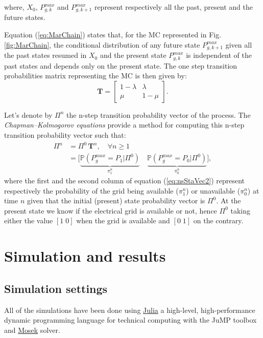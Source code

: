 \documentclass[conference]{IEEEtran}
\begin{document}
where, $X_0$, $P^{max}_{g,k}$ and $P^{max}_{g,k+1}$ represent respectively all the past,  present and the future states. 

Equation (\ref{eq:MarChain}) states that, for the MC represented in Fig. \ref{fig:MarChain}, the conditional distribution of any future state $P^{max}_{g,k+1}$ given all the past states resumed in $X_0$ and the present state $P^{max}_{g,k}$ is independent of the past states and
depends only on the present state. The one step transition probabilities matrix representing the MC is then given by: 
\begin{equation}\label{eq:MarChain_TransMat}
\mathbf{T} = 
  \begin{bmatrix}
 1-\lambda  & \lambda \\ 
 \mu & 1- \mu
\end{bmatrix} . 
\end{equation}

Let's denote by $\Pi^n$ the n-step transition probability vector of the process. The \textit{Chapman–Kolmogorov equations} provide a method for computing this n-step  transition probability vector such that: 
\begin{subequations}
    \begin{align}
    \Pi^n & = \Pi^0 \, \mathbf{T}^n, \quad \forall n \geq 1 \label{eq:nsStaVec1} \\
          & = \bigl[ \underbrace{\mathbb{P} (P_g^{max} = P_1 | \Pi^0)}_{\pi^n_1}\quad \underbrace{\mathbb{P} (P_g^{max} = P_0 | \Pi^0)}_{\pi_{0}^n} \bigl] \label{eq:nsStaVec2},
\end{align}
\end{subequations}
where the first and the second column of equation (\ref{eq:nsStaVec2}) represent respectively the probability of the grid being available ($\pi_{1}^n$) or unavailable ($\pi_{0}^n$) at time $n$ given that the initial (present) state probability vector  is $\Pi^0$. At the present state we know if the electrical grid is available or not, hence $\Pi^0$ taking either the value $[1\;0]$ when the grid is available and $[0\;1]$ on the contrary.


 \section{Simulation and results}
 
 \subsection{Simulation settings}
 All of the simulations have been done using \href{http://www.juliaopt.org/}{Julia} a high-level, high-performance dynamic programming language for technical computing with the JuMP toolbox and \href{https://www.mosek.com/}{Mosek} solver. 
 
\end{document}
